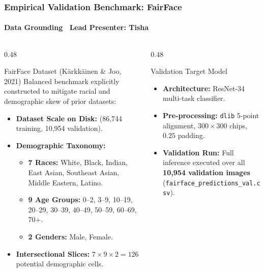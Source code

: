 \begin{frame}
  \frametitle{Empirical Validation Benchmark: FairFace}
  \framesubtitle{Data Grounding \textbar\ Lead Presenter: Tisha}

  \begin{columns}[T]
    \begin{column}{0.48\textwidth}
      \begin{card}{FairFace Dataset (K\"arkk\"ainen \& Joo, 2021)}
        \scriptsize
        Balanced benchmark explicitly constructed to mitigate racial and demographic skew of prior datasets:
        \vspace{0.1cm}
        \begin{itemize}\scriptsize
          \item \textbf{Dataset Scale on Disk:}  (86,744 training, 10,954 validation).
          \item \textbf{Demographic Taxonomy:}
            \begin{itemize}\tiny
              \item \textbf{7 Races:} White, Black, Indian, East Asian, Southeast Asian, Middle Eastern, Latino.
              \item \textbf{9 Age Groups:} 0--2, 3--9, 10--19, 20--29, 30--39, 40--49, 50--59, 60--69, 70+.
              \item \textbf{2 Genders:} Male, Female.
            \end{itemize}
          \item \textbf{Intersectional Slices:} $7 \times 9 \times 2 = 126$ potential demographic cells.
        \end{itemize}
      \end{card}
    \end{column}

    \begin{column}{0.48\textwidth}
      \begin{statcard}{Validation Target Model}
        \scriptsize
        \begin{itemize}\scriptsize
          \item \textbf{Architecture:} ResNet-34 multi-task classifier.
          \item \textbf{Pre-processing:} \texttt{dlib} 5-point alignment, $300 \times 300$ chips, $0.25$ padding.
          \item \textbf{Validation Run:} Full inference executed over all \textbf{10,954 validation images} (\texttt{fairface\_predictions\_val.csv}).
        \end{itemize}
      \end{statcard}


\end{column}
\end{columns}
\end{frame}
